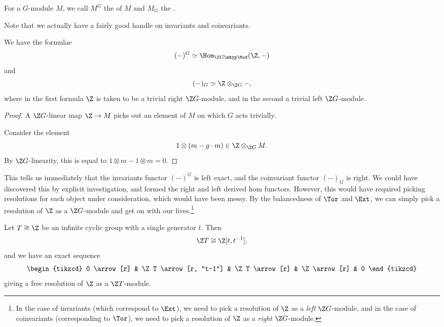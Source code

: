 \documentclass[main.tex]{subfiles}
\begin{document}
\begin{definition}
  \label{def:invariants_coinvariants}
  For a $G$-module $M$, we call $M^{G}$ the  of $M$ and $M_{G}$ the .
\end{definition}

Note that we actually have a fairly good handle on invariants and coinvariants.

\begin{lemma}
  \label{lemma:invariants_and_coinvariants_in_terms_of_tensor_and_hom}
  We have the formulae
  \begin{equation*}
    (-)^{G} \simeq \Hom_{\Z G\mhyp\Mod}(\Z, -)
  \end{equation*}
  and
  \begin{equation*}
    (-)_{G} \simeq \Z \otimes_{\Z G} -,
  \end{equation*}
  where in the first formula $\Z$ is taken to be a trivial right $\Z G$-module, and in the second a trivial left $\Z G$-module.
\end{lemma}
\begin{proof}
  A $\Z G$-linear map $\Z \to M$ picks out an element of $M$ on which $G$ acts trivially.

  Consider the element
  \begin{equation*}
    1 \otimes(m - g\cdot m) \in \Z \otimes_{\Z G} M.
  \end{equation*}
  By $\Z G$-linearity, this is equal to $1 \otimes m - 1 \otimes m = 0$.
\end{proof}

This tells us immediately that the invariants functor $(-)^{G}$ is left exact, and the coinvariant functor $(-)_{G}$ is right. We could have discovered this by explicit investigation, and formed the right and left derived hom functors. However, this would have required picking resolutions for each object under consideration, which would have been messy. By the balancedness of $\Tor$ and $\Ext$, we can simply pick a resolution of $\Z$ as a $\Z G$-module and get on with our lives.\footnote{In the case of invariants (which correspond to $\Ext$), we need to pick a resolution of $\Z$ as a \emph{left} $\Z G$-module, and in the case of coinvariants (corresponding to $\Tor$), we need to pick a resolution of $\Z$ as a \emph{right} $\Z G$-module.}

\begin{example}
  Let $T \cong \Z$ be an infinite cyclic group with a single generator $t$. Then
  \begin{equation*}
    \Z T \cong \Z[t, t^{-1}],
  \end{equation*}
  and we have an exact sequence
  \begin{equation*}
    \begin{tikzcd}
      0
      \arrow[r]
      & \Z T
      \arrow[r, "t-1"]
      & \Z T
      \arrow[r]
      & \Z
      \arrow[r]
      & 0
    \end{tikzcd}
  \end{equation*}
  giving a free resolution of $\Z$ as a $\Z T$-module.
\end{example}
\end{document}
